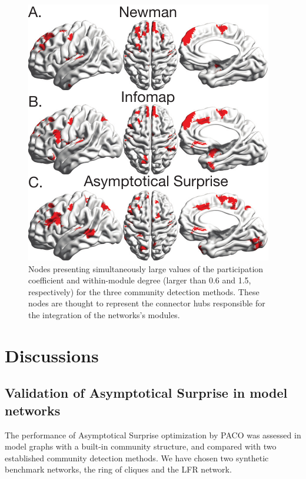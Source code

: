 \begin{figure}[htb!]
\includegraphics[width=\textwidth]{images/pacopaperfigure9.pdf}
\caption{Nodes presenting simultaneously large values of the participation coefficient and  within-module degree (larger than 0.6 and 1.5, respectively) for the three community detection methods. These nodes are thought to represent the connector hubs responsible for the integration of the networks's modules.
}
\label{fig:hubclassification_threshold}
\end{figure}

\section{Discussions}
\subsection{Validation of Asymptotical Surprise in model networks}
The performance of Asymptotical Surprise optimization by PACO was assessed in model graphs with a built-in community structure, and compared with two established community detection methods. We have chosen two synthetic benchmark networks, the ring of cliques and the LFR network.

